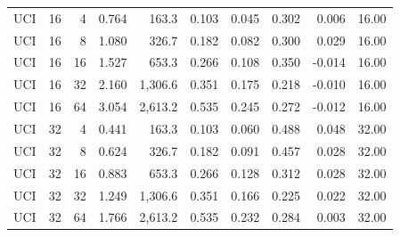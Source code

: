 \begin{longtable}{lrrrrrrrrr}
UCI & 16 & 4 & 0.764 & 163.3 & 0.103 & 0.045 & 0.302 & 0.006 & 16.00 \\
UCI & 16 & 8 & 1.080 & 326.7 & 0.182 & 0.082 & 0.300 & 0.029 & 16.00 \\
UCI & 16 & 16 & 1.527 & 653.3 & 0.266 & 0.108 & 0.350 & -0.014 & 16.00 \\
UCI & 16 & 32 & 2.160 & 1,306.6 & 0.351 & 0.175 & 0.218 & -0.010 & 16.00 \\
UCI & 16 & 64 & 3.054 & 2,613.2 & 0.535 & 0.245 & 0.272 & -0.012 & 16.00 \\
UCI & 32 & 4 & 0.441 & 163.3 & 0.103 & 0.060 & 0.488 & 0.048 & 32.00 \\
UCI & 32 & 8 & 0.624 & 326.7 & 0.182 & 0.091 & 0.457 & 0.028 & 32.00 \\
UCI & 32 & 16 & 0.883 & 653.3 & 0.266 & 0.128 & 0.312 & 0.028 & 32.00 \\
UCI & 32 & 32 & 1.249 & 1,306.6 & 0.351 & 0.166 & 0.225 & 0.022 & 32.00 \\
UCI & 32 & 64 & 1.766 & 2,613.2 & 0.535 & 0.232 & 0.284 & 0.003 & 32.00 \\
\end{longtable}
